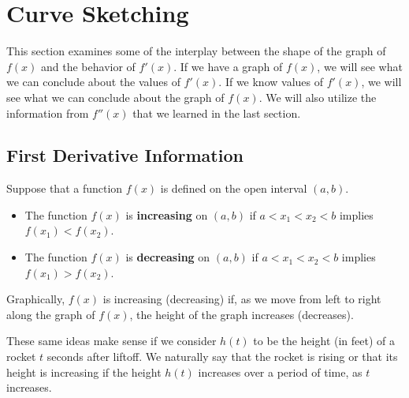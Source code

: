 \section{Curve Sketching}
\label{sec:sketching}

This section examines some of the interplay between the shape of the graph of $f(x)$ and the behavior of $f'(x)$. If we have a graph of $f(x)$, we will see what we can conclude about the values of $f'(x)$. If we know values of $f'(x)$, we will see what we can conclude about the graph of $f(x)$. We will also utilize the information from $f''(x)$ that we learned in the last section.

\subsection{First Derivative Information}
\begin{definition}
Suppose that a function $f(x)$ is defined on the open interval $(a, b)$.
    \begin{itemize}[label={}]
    \item The function $f(x)$ is {\bf increasing} on $(a,b)$ if $a<x_1<x_2<b$ implies $f(x_1)<f(x_2)$.
    \item The function $f(x)$ is {\bf decreasing} on $(a,b)$ if $a<x_1<x_2<b$ implies $f(x_1)>f(x_2)$.
    \end{itemize}
\end{definition}
Graphically, $f(x)$ is increasing (decreasing) if, as we move from left to right along the graph of $f(x)$, the height of the graph increases (decreases).

These same ideas make sense if we consider $h(t)$ to be the height (in feet) of a rocket $t$ seconds after liftoff. We naturally say that the rocket is rising or that its height is increasing if the height $h(t)$ increases over a period of time, as $t$ increases.

